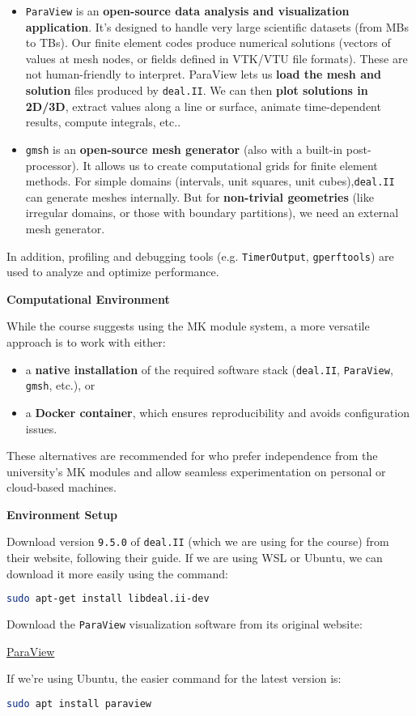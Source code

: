 \begin{itemize}
    \item \texttt{ParaView} is an \textbf{open-source data analysis and visualization application}. It's designed to handle very large scientific datasets (from MBs to TBs). Our finite element codes produce numerical solutions (vectors of values at mesh nodes, or fields defined in VTK/VTU file formats). These are not human-friendly to interpret. ParaView lets us \textbf{load the mesh and solution} files produced by \texttt{deal.II}. We can then \textbf{plot solutions in 2D/3D}, extract values along a line or surface, animate time-dependent results, compute integrals, etc..


    \item \texttt{gmsh} is an \textbf{open-source mesh generator} (also with a built-in post-processor). It allows us to create computational grids for finite element methods. For simple domains (intervals, unit squares, unit cubes),\break \texttt{deal.II} can generate meshes internally. But for \textbf{non-trivial geometries} (like irregular domains, or those with boundary partitions), we need an external mesh generator.
\end{itemize}
In addition, profiling and debugging tools (e.g. \texttt{TimerOutput}, \texttt{gperftools}) are used to analyze and optimize performance.

\highspace
\begin{flushleft}
    \textcolor{Green3}{\faIcon{\speedIcon} \textbf{Computational Environment}}
\end{flushleft}
While the course suggests using the MK module system, a more versatile approach is to work with either:
\begin{itemize}
    \item a \textbf{native installation} of the required software stack (\texttt{deal.II}, \texttt{ParaView}, \texttt{gmsh}, etc.), or
    \item a \textbf{Docker container}, which ensures reproducibility and avoids configuration issues.
\end{itemize}
These alternatives are recommended for who prefer independence from the university's MK modules and allow seamless experimentation on personal or cloud-based machines.

\newpage

\begin{flushleft}
    \textcolor{Green3}{ \textbf{Environment Setup}}
\end{flushleft}
Download version \texttt{9.5.0} of \texttt{deal.II} (which we are using for the course) from their website, following their guide. If we are using WSL or Ubuntu, we can download it more easily using the command:
\begin{lstlisting}[language=bash]
sudo apt-get install libdeal.ii-dev
\end{lstlisting}
Download the \texttt{ParaView} visualization software from its original website:
\begin{center}
    \href{https://www.paraview.org/download/}{ParaView} \vspace{3em} 
\end{center}

\noindent
If we're using Ubuntu, the easier command for the latest version is:
\begin{lstlisting}[language=bash]
sudo apt install paraview
\end{lstlisting}